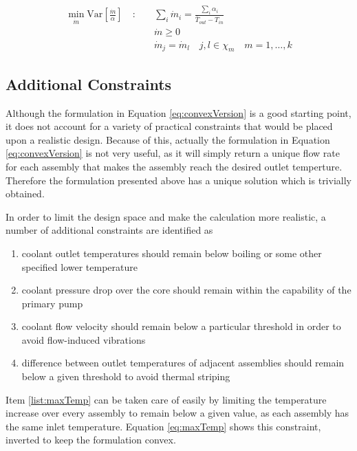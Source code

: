 \documentclass[11pt, oneside]{article}   	%
\newcommand{\Var}{\mathrm{Var}}
\begin{document}
\begin{align}
\min_{\dot{m}} \Var [\frac{\dot{m}}{\alpha}] \quad : \quad & \sum_i \dot{m}_i = \frac{\sum_i \alpha_i}{\bar{T}_{out}-T_{in}} \label{eq:convexVersion} \\
& \dot{m} \geq 0 \nonumber \\
& \dot{m}_j = \dot{m}_l \quad j,l \in \chi_m \quad m = 1, \dots, k \nonumber
\end{align}

\subsection{Additional Constraints}

Although the formulation in Equation \ref{eq:convexVersion} is a good starting point, it does not account for a variety of practical constraints that would be placed upon a realistic design.
Because of this, actually the formulation in Equation \ref{eq:convexVersion} is not very useful, as it will simply return a unique flow rate for each assembly that makes the assembly reach the desired outlet temperture.
Therefore the formulation presented above has a unique solution which is trivially obtained. 

In order to limit the design space and make the calculation more realistic, a number of additional constraints are identified as

\begin{enumerate}
\item \label{list:maxTemp}coolant outlet temperatures should remain below boiling or some other specified lower temperature 
\item \label{list:dP} coolant pressure drop over the core should remain within the capability of the primary pump
\item \label{list:v_max} coolant flow velocity should remain below a particular threshold in order to avoid flow-induced vibrations
\item \label{list:adjacent} difference between outlet temperatures of adjacent assemblies should remain below a given threshold to avoid thermal striping
\end{enumerate}

Item \ref{list:maxTemp} can be taken care of easily by limiting the temperature increase over every assembly to remain below a given value, as each assembly has the same inlet temperature.
Equation \ref{eq:maxTemp} shows this constraint, inverted to keep the formulation convex.
\end{document}
